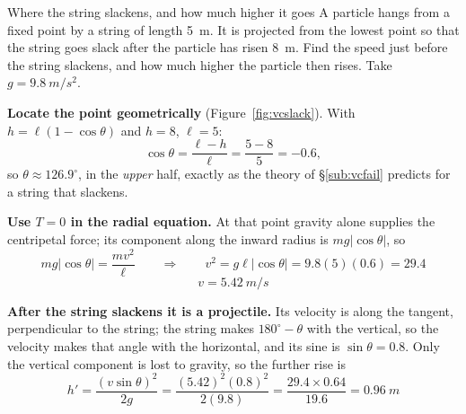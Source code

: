 \begin{exbox}{Where the string slackens, and how much higher it goes}\label{ex:slack}
A particle hangs from a fixed point by a string of length \SI{5}{m}. It is projected from the lowest
point so that the string goes slack after the particle has risen \SI{8}{m}. Find the speed just before
the string slackens, and how much higher the particle then rises. Take $g=\SI{9.8}{m/s^2}$.

 \textbf{Locate the point geometrically} (Figure~\ref{fig:vcslack}). With $h=\ell(1-\cos\theta)$ and $h=8$, $\ell=5$:
\[
\cos\theta=\frac{\ell-h}{\ell}=\frac{5-8}{5}=-0.6,
\]
so $\theta\approx126.9^\circ$, in the \emph{upper} half, exactly as the theory of \S\ref{sub:vcfail} predicts
for a string that slackens.

 \textbf{Use $T=0$ in the radial equation.} At that point gravity alone supplies the
centripetal force; its component along the inward radius is $mg|\cos\theta|$, so
\[
mg|\cos\theta|=\frac{mv^{2}}{\ell}
\qquad\Longrightarrow\qquad
v^{2}=g\ell|\cos\theta|=9.8(5)(0.6)=29.4
\]
\[
v=\boxed{\SI{5.42}{m/s}}
\]

 \textbf{After the string slackens it is a projectile.} Its velocity is along the tangent,
perpendicular to the string; the string makes $180^\circ-\theta$ with the vertical, so the velocity makes
that angle with the horizontal, and its sine is $\sin\theta=0.8$. Only the vertical component is lost to
gravity, so the further rise is
\[
h'=\frac{(v\sin\theta)^{2}}{2g}=\frac{(5.42)^{2}(0.8)^{2}}{2(9.8)}
=\frac{29.4\times0.64}{19.6}=\boxed{\SI{0.96}{m}}
\]
\end{exbox}

